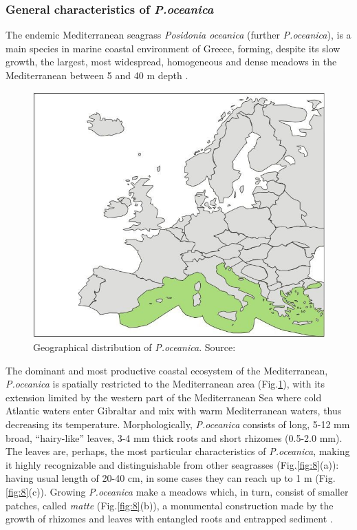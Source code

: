 \documentclass[11pt]{article}
\begin{document}
\subsubsection{General characteristics of \textit{P.oceanica}}
The endemic Mediterranean seagrass \textit{Posidonia oceanica} (further \textit{P.oceanica}), is a main species in
marine coastal environment of Greece, forming, despite its slow growth, the largest, most widespread,
homogeneous and dense meadows in the Mediterranean between 5 and 40 m depth \cite{DenHartog70}\label{DenHartog70}.

\begin{figure}
	\centering
	\includegraphics[scale=0.20]{Fig-1-5.jpg}
	\caption{Geographical distribution of
	\textit{P.oceanica}. Source: \cite{Borum04}\label{Borum04}}
	\label{fig:5}
\end{figure}

The dominant and most productive coastal ecosystem of the Mediterranean, \textit{P.oceanica} is
spatially restricted to the Mediterranean area (Fig.\ref{fig:5}), 
with its extension limited by the western part of the Mediterranean Sea where cold Atlantic waters enter Gibraltar and mix with warm
Mediterranean waters, thus decreasing its temperature.
Morphologically, \textit{P.oceanica} consists of long, 5-12 mm broad, “hairy-like” leaves, 3-4 mm thick roots and short rhizomes (0.5-2.0 mm). 
The leaves are, perhaps, the most particular characteristics of \textit{P.oceanica}, making it highly recognizable and distinguishable from other seagrasses (Fig.\ref{fig:8}(a)): having usual length of 20-40 cm, in some cases they can reach up to 1 m \cite{Borum04}\label{Borum04}  (Fig.\ref{fig:8}(c)).
Growing \textit{P.oceanica} make a meadows which, in turn, consist of smaller patches, called \textit{matte}
(Fig.\ref{fig:8}(b)), a monumental construction made by the growth of rhizomes and leaves with entangled roots
and entrapped sediment \cite{Francour06}\label{Francour06}.
\end{document}
